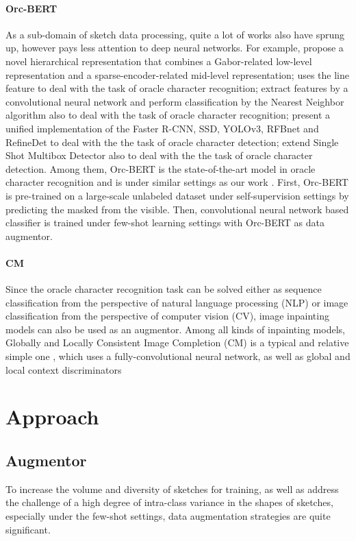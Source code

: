 \documentclass{article}
\begin{document}
\paragraph{Orc-BERT}
As a sub-domain of sketch data processing, quite a lot of works also have sprung up, however pays less attention to deep neural networks. For example, \cite{Hierachical} propose a novel hierarchical representation that combines a Gabor-related low-level representation and a sparse-encoder-related mid-level representation; \citep{Line} uses the line feature to deal with the task of oracle character recognition; \citep{Neighbor} extract features by a convolutional neural network and perform classification by the Nearest Neighbor algorithm also to deal with the task of oracle character recognition; \citep{Detection} present a unified implementation of the Faster R-CNN, SSD, YOLOv3, RFBnet and RefineDet to deal with the the task of oracle character detection; \citep{SSD} extend Single Shot Multibox Detector also to deal with the the task of oracle character detection. Among them, Orc-BERT is the state-of-the-art model in oracle character recognition and is under similar settings as our work \citep{Orc-BERT}.
First, Orc-BERT is pre-trained on a large-scale unlabeled dataset under self-supervision settings by predicting the masked from the visible. Then, convolutional neural network based classifier is trained under few-shot learning settings with Orc-BERT as data augmentor.

\paragraph{CM}
Since the oracle character recognition task can be solved either as sequence classification from the perspective of natural language processing (NLP) or image classification from the perspective of computer vision (CV), image inpainting models can also be used as an augmentor. Among all kinds of inpainting models, Globally and Locally Consistent Image Completion (CM) is a typical and relative simple one \citep{CM}, which uses a fully-convolutional neural network, as well as global and local context discriminators 

\section{Approach}

\subsection{Augmentor}
To increase the volume and diversity of sketches for training, as well as address the challenge of a high degree of intra-class variance in the shapes of sketches, especially under the few-shot settings, data augmentation strategies are quite significant. 
\end{document}
